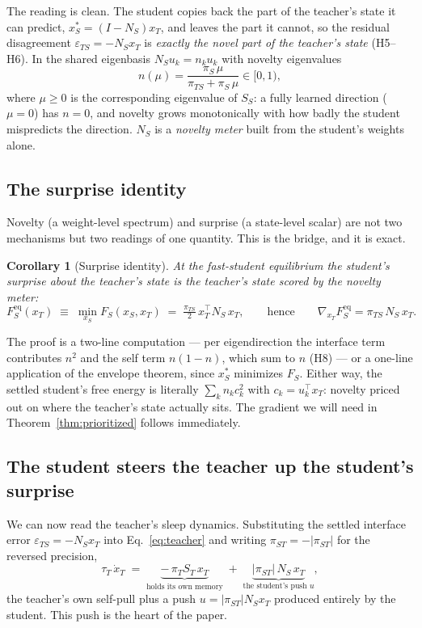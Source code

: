 \documentclass[10pt,letterpaper]{article}
\theoremstyle{plain}
\newtheorem{corollary}{Corollary}
\theoremstyle{remark}
\newcommand{\eps}{\varepsilon}
\newcommand{\xT}{x_T}
\newcommand{\xS}{x_S}
\newcommand{\ST}{S_T}
\renewcommand{\SS}{S_S}
\newcommand{\NS}{N_S}
\newcommand{\FS}{F_S}
\newcommand{\FSeq}{F_S^{\mathrm{eq}}}
\newcommand{\epsTS}{\eps_{TS}}
\newcommand{\piT}{\pi_T}
\newcommand{\piS}{\pi_S}
\newcommand{\piTS}{\pi_{TS}}
\newcommand{\piST}{\pi_{ST}}
\newcommand{\tauT}{\tau_T}
\newcommand{\tr}{^{\!\top}}
\begin{document}
The reading is clean. The student copies back the part of the teacher's state it can predict,
$\xS^{*}=(I-\NS)\xT$, and leaves the part it cannot, so the residual disagreement $\epsTS=-\NS\xT$ is
\emph{exactly the novel part of the teacher's state} (H5--H6). In the shared eigenbasis
$\NS u_k=n_k u_k$ with novelty eigenvalues
\begin{equation}
\label{eq:spectrum}
n(\mu)=\frac{\piS\,\mu}{\piTS+\piS\,\mu}\in[0,1),
\end{equation}
where $\mu\ge 0$ is the corresponding eigenvalue of $\SS$: a fully learned direction ($\mu=0$) has
$n=0$, and novelty grows monotonically with how badly the student mispredicts the direction. $\NS$ is a
\emph{novelty meter} built from the student's weights alone.

\subsection{The surprise identity}
Novelty (a weight-level spectrum) and surprise (a state-level scalar) are not two mechanisms but two
readings of one quantity. This is the bridge, and it is exact.

\begin{corollary}[Surprise identity]
\label{cor:surprise}
At the fast-student equilibrium the student's surprise about the teacher's state is the teacher's state
scored by the novelty meter:
\begin{equation}
\label{eq:surpriseid}
\FSeq(\xT)\;\equiv\;\min_{\xS}\FS(\xS,\xT)\;=\;\tfrac{\piTS}{2}\,\xT\tr\NS\,\xT,
\qquad\text{hence}\qquad
\nabla_{\xT}\FSeq=\piTS\,\NS\,\xT.
\end{equation}
\end{corollary}

The proof is a two-line computation --- per eigendirection the interface term contributes $n^{2}$ and
the self term $n(1-n)$, which sum to $n$ (H8) --- or a one-line application of the envelope theorem,
since $\xS^{*}$ minimizes $\FS$. Either way, the settled student's free energy is literally
$\sum_k n_k c_k^{2}$ with $c_k=u_k\tr\xT$: novelty priced out on where the teacher's state actually
sits. The gradient we will need in Theorem~\ref{thm:prioritized} follows immediately.

\subsection{The student steers the teacher up the student's surprise}
We can now read the teacher's sleep dynamics. Substituting the settled interface error
$\epsTS=-\NS\xT$ into Eq.~\eqref{eq:teacher} and writing $\piST=-|\piST|$ for the reversed precision,
\begin{equation}
\label{eq:teacher_reduced}
\tauT\,\dot\xT \;=\; \underbrace{-\,\piT \ST\,\xT}_{\text{holds its own memory}}
\;+\; \underbrace{|\piST|\,\NS\,\xT}_{\text{the student's push } u},
\end{equation}
the teacher's own self-pull plus a push $u=|\piST|\NS\xT$ produced entirely by the student. This push
is the heart of the paper.
\end{document}
